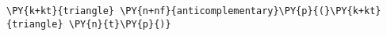 \begin{Verbatim}[commandchars=\\\{\}]
    \PY{k+kt}{triangle} \PY{n+nf}{anticomplementary}\PY{p}{(}\PY{k+kt}{triangle} \PY{n}{t}\PY{p}{)}
\end{Verbatim}
